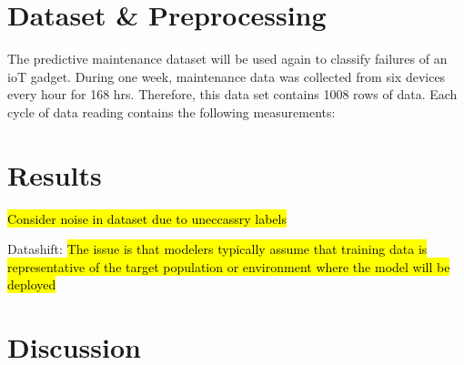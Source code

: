 \section{Dataset \& Preprocessing}
The predictive maintenance dataset will be used again to classify failures of an ioT gadget.
During one week, maintenance data was collected from six devices every hour for 168 hrs.
Therefore, this data set contains 1008 rows of data. 
Each cycle of data reading contains the following measurements: 

\section{Results}
\hl{Consider noise in dataset due to uneccassry labels}

Datashift:
\hl{The issue is that modelers typically assume that training data
is representative of the target population or environment where
the model will be deployed} \cite{saria2019tutorial}

\section{Discussion}
